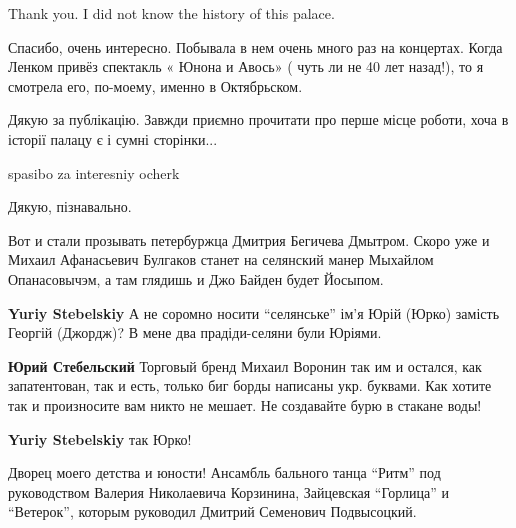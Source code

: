  
 
 
 
 
\zzSecCmt


\begin{itemize} %

Thank you. I did not know the history of this palace.


Спасибо, очень интересно. Побывала в нем очень много раз на концертах. Когда
Ленком привёз спектакль « Юнона и Авось» ( чуть ли не 40 лет назад!), то я
смотрела его, по-моему, именно в Октябрьском.


Дякую за публікацію. Завжди приємно прочитати про перше місце роботи, хоча в
історії палацу є і сумні сторінки...

spasibo za interesniy ocherk

Дякую, пізнавально.


Вот и стали прозывать петербуржца Дмитрия Бегичева Дмытром.  Скоро уже и Михаил
Афанасьевич Булгаков станет на селянский манер Мыхайлом Опанасовычэм, а там
глядишь и Джо Байден будет Йосыпом.

\begin{itemize} %
\textbf{Yuriy Stebelskiy} А не соромно носити \enquote{селянське} ім'я Юрій (Юрко) замість Георгій (Джордж)? В мене два прадіди-селяни були Юріями.

\textbf{Юрий Стебельский} Торговый бренд Михаил Воронин так им и остался, как запатентован, так и есть, только биг борды написаны укр. буквами. Как хотите так и произносите вам никто не мешает. Не создавайте бурю в стакане воды!

\textbf{Yuriy Stebelskiy} так Юрко!
\end{itemize} %


Дворец моего детства и юности! Ансамбль бального танца \enquote{Ритм} под руководством
Валерия Николаевича Корзинина, Зайцевская \enquote{Горлица} и \enquote{Ветерок}, которым руководил
Дмитрий Семенович Подвысоцкий.


\end{itemize}
